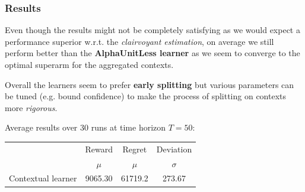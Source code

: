 
\begin{frame}

\frametitle{Results}

Even though the results might not be completely satisfying as we would expect a performance superior w.r.t. the \textit{clairvoyant estimation}, on average we still perform better than the \textbf{AlphaUnitLess learner} as we seem to converge to the optimal superarm for the aggregated contexts.

Overall the learners seem to prefer \textbf{early splitting} but various parameters can be tuned (e.g. bound confidence) to make the process of splitting on contexts more \textit{rigorous}.

Average results over 30 runs at time horizon $T = 50$:

\begin{table}
    \begin{tabular}{|c|cc|c|}
    \hline \hline
        \cellcolor{blue!25} & Reward 	& Regret	& Deviation \\
    \cline{2-4}
        \cellcolor{blue!25} & $\mu$		& $\mu$		& $\sigma$	\\
    \hline \hline
        Contextual learner	& 9065.30	& 61719.2	&  273.67	\\
    \hline \hline
    \end{tabular}
\end{table}

\end{frame}

